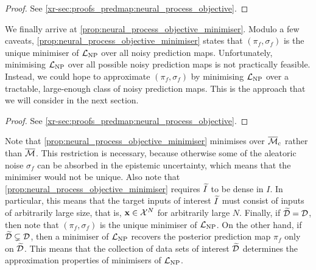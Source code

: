 \documentclass[12pt, twoside]{report}
\newcommand{\xrprefix}[1]{xr-#1}
\begin{document}
\begin{proof}
    See \cref{\xrprefix{sec:proofs_predmap:neural_process_objective}}.
\end{proof}

We finally arrive at \cref{prop:neural_process_objective_minimiser}.
Modulo a few caveats, \cref{prop:neural_process_objective_minimiser} states that $(\pi_f, \sigma_f)$ is the unique minimiser of $\L\ss{NP}$ over all noisy prediction maps.
Unfortunately, minimising $\L\ss{NP}$ over all possible noisy prediction maps is not practically feasible.
Instead, we could hope to approximate $(\pi_f, \sigma_f)$ by minimising $\L\ss{NP}$ over a tractable, large-enough class of noisy prediction maps.
This is the approach that we will consider in the next section.

\begin{proof}
    See \cref{\xrprefix{sec:proofs_predmap:neural_process_objective}}.
\end{proof}

Note that \cref{prop:neural_process_objective_minimiser} minimises over $\overline{\M}\ss{c}$ rather than $\overline{\mathcal{M}}$.
This restriction is necessary, because otherwise some of the aleatoric noise $\sigma_f$ can be absorbed in the epistemic uncertainty, which means that the minimiser would not be unique.
Also note that \cref{prop:neural_process_objective_minimiser} requires $\widetilde{I}$ to be dense in $I$.
In particular, this means that the target inputs of interest $\widetilde{I}$ must consist of inputs of arbitrarily large size, that is, $\mathbf{x} \in \mathcal{X}^N$ for arbitrarily large $N$.
Finally, if $\widetilde{\mathcal{D}} = \mathcal{D}$, then note that $(\pi_f, \sigma_f)$ is the unique minimiser of $\L\ss{NP}$.
On the other hand, if $\widetilde{\mathcal{D}} \subsetneq \mathcal{D}$, then
 a minimiser of $\L\ss{NP}$ recovers the posterior prediction map $\pi_f$ only on $\widetilde{\mathcal{D}}$.
This means that the collection of data sets of interest $\widetilde{\mathcal{D}}$ determines the approximation properties of minimisers of $\L\ss{NP}$.
\end{document}
